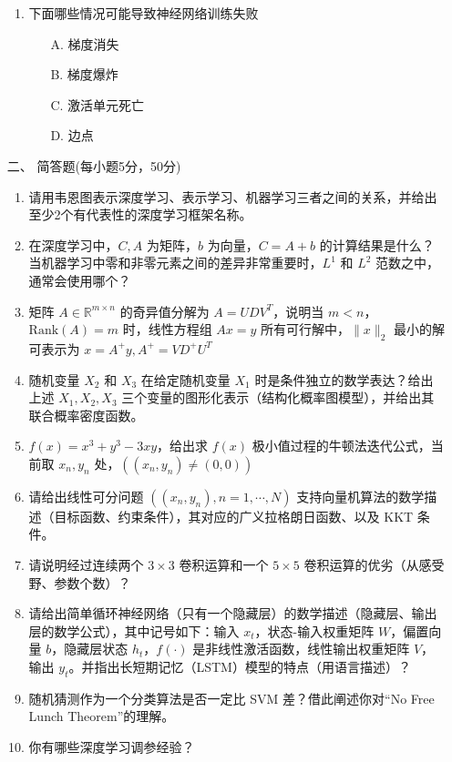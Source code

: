 \begin{itemize}
\begin{enumerate}
    \item 下面哪些情况可能导致神经网络训练失败
    \begin{itemize}
        \item[A.] 梯度消失
        \item[B.] 梯度爆炸
        \item[C.] 激活单元死亡
        \item[D.] 边点
    \end{itemize}
\end{enumerate}

\item [二、] 简答题(每小题5分，50分)


\begin{enumerate}
    \item 请用韦恩图表示深度学习、表示学习、机器学习三者之间的关系，并给出至少2个有代表性的深度学习框架名称。
    \item 在深度学习中，$C, A$ 为矩阵，$b$ 为向量，$C = A + b$ 的计算结果是什么？当机器学习中零和非零元素之间的差异非常重要时，$L^1$ 和 $L^2$ 范数之中，通常会使用哪个？
    \item 矩阵 $A \in \mathbb{R}^{m \times n}$ 的奇异值分解为 $A = UDV^T$，说明当 $m < n$，$\text{Rank}(A) = m$ 时，线性方程组 $Ax = y$ 所有可行解中，$\|x\|_2$ 最小的解可表示为 $x = A^+ y, A^+ = V D^+ U^T$
    \item 随机变量 $X_2$ 和 $X_3$ 在给定随机变量 $X_1$ 时是条件独立的数学表达？给出上述 $X_1, X_2, X_3$ 三个变量的图形化表示（结构化概率图模型），并给出其联合概率密度函数。
    \item $f(x) = x^3 + y^3 - 3xy$，给出求 $f(x)$ 极小值过程的牛顿法迭代公式，当前取 $x_n, y_n$ 处，$((x_n, y_n) \ne (0, 0))$
    \item 请给出线性可分问题 $((x_n, y_n), n = 1, \cdots, N)$ 支持向量机算法的数学描述（目标函数、约束条件），其对应的广义拉格朗日函数、以及 KKT 条件。
    \item 请说明经过连续两个 $3 \times 3$ 卷积运算和一个 $5 \times 5$ 卷积运算的优劣（从感受野、参数个数）？
    \item 请给出简单循环神经网络（只有一个隐藏层）的数学描述（隐藏层、输出层的数学公式），其中记号如下：输入 $x_t$，状态-输入权重矩阵 $W$，偏置向量 $b$，隐藏层状态 $h_t$，$f(\cdot)$ 是非线性激活函数，线性输出权重矩阵 $V$，输出 $y_t$。并指出长短期记忆（LSTM）模型的特点（用语言描述）？
    \item 随机猜测作为一个分类算法是否一定比 SVM 差？借此阐述你对“No Free Lunch Theorem”的理解。
    \item 你有哪些深度学习调参经验？
\end{enumerate}


\end{itemize}
